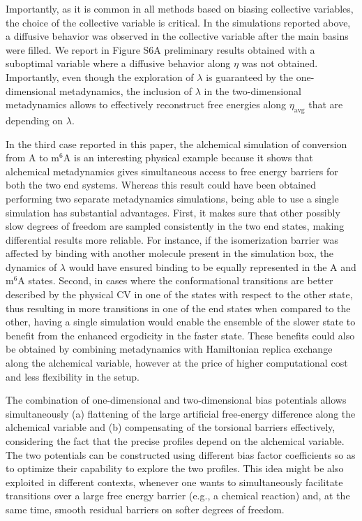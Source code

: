 \documentclass[journal=jacsat,manuscript=article]{achemso}
\begin{document}
Importantly, as it is common in all methods based on biasing collective variables, the choice of the collective variable is critical. In the simulations reported above, a diffusive behavior was observed in the collective variable after the main basins were filled. We report in Figure S6A preliminary results obtained with a suboptimal variable where a diffusive behavior along $\eta$ was not obtained. Importantly, even though the exploration of $\lambda$ is guaranteed by the one-dimensional metadynamics, the inclusion of $\lambda$ in the two-dimensional metadynamics allows to effectively reconstruct free energies along $\eta_{\text{avg}}$ that are depending on $\lambda$.

In the third case reported in this paper, the alchemical simulation of conversion from A to m$^6$A is an interesting physical example because it shows that alchemical metadynamics gives simultaneous access to free energy barriers for both the two end systems. Whereas this result could have been obtained performing two separate metadynamics simulations, being able to use a single simulation has substantial advantages. First, it makes sure that other possibly slow degrees of freedom are sampled consistently in the two end states, making differential results more reliable. For instance, if the isomerization barrier was affected by binding with another molecule present in the simulation box, the dynamics of $\lambda$ would have ensured binding to be equally represented in the A and m$^6$A states. Second, in cases where the conformational transitions are better described by the physical CV in one of the states with respect to the other state, thus resulting in more transitions in one of the end states when compared to the other, having a single simulation would enable the ensemble of the slower state to benefit from the enhanced ergodicity in the faster state. These benefits could also be obtained by combining metadynamics with Hamiltonian replica exchange along the alchemical variable, however at the price of higher computational cost and less flexibility in the setup.

The combination of one-dimensional and two-dimensional bias potentials allows simultaneously (a) flattening of the large artificial free-energy difference along the alchemical variable and (b) compensating of the torsional barriers effectively, considering the fact that the precise profiles depend on the alchemical variable. The two potentials can be constructed using different bias factor coefficients so as to optimize their capability to explore the two profiles. This idea might be also exploited in different contexts, whenever one wants to simultaneously facilitate transitions over a large free energy barrier (e.g., a chemical reaction) and, at the same time, smooth residual barriers on softer degrees of freedom.
\end{document}
